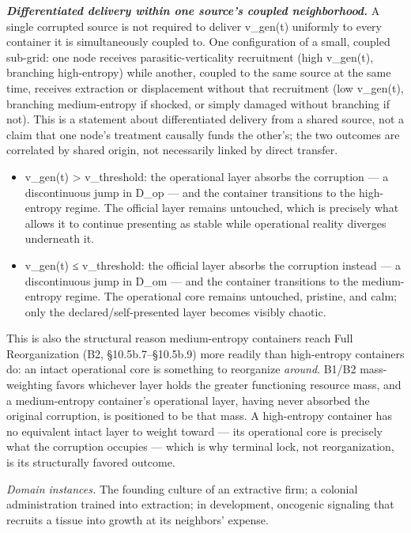 \documentclass[
]{article}
\begin{document}
\emph{\textbf{Differentiated delivery within one source's coupled
neighborhood.}} A single corrupted source is not required to deliver
v\_gen(t) uniformly to every container it is simultaneously coupled to.
One configuration of a small, coupled sub-grid: one node receives
parasitic-verticality recruitment (high v\_gen(t), branching
high-entropy) while another, coupled to the same source at the same
time, receives extraction or displacement without that recruitment (low
v\_gen(t), branching medium-entropy if shocked, or simply damaged
without branching if not). This is a statement about differentiated
delivery from a shared source, not a claim that one node's treatment
causally funds the other's; the two outcomes are correlated by shared
origin, not necessarily linked by direct transfer.

\begin{itemize}
\item
  v\_gen(t) \textgreater{} v\_threshold: the operational layer absorbs
  the corruption --- a discontinuous jump in D\_op --- and the container
  transitions to the high-entropy regime. The official layer remains
  untouched, which is precisely what allows it to continue presenting as
  stable while operational reality diverges underneath it.
\item
  v\_gen(t) ≤ v\_threshold: the official layer absorbs the corruption
  instead --- a discontinuous jump in D\_om --- and the container
  transitions to the medium-entropy regime. The operational core remains
  untouched, pristine, and calm; only the declared/self-presented layer
  becomes visibly chaotic.
\end{itemize}

This is also the structural reason medium-entropy containers reach Full
Reorganization (B2, §10.5b.7--§10.5b.9) more readily than high-entropy
containers do: an intact operational core is something to reorganize
\emph{around}. B1/B2 mass-weighting favors whichever layer holds the
greater functioning resource mass, and a medium-entropy container's
operational layer, having never absorbed the original corruption, is
positioned to be that mass. A high-entropy container has no equivalent
intact layer to weight toward --- its operational core is precisely what
the corruption occupies --- which is why terminal lock, not
reorganization, is its structurally favored outcome.

\emph{Domain instances.} The founding culture of an extractive firm; a
colonial administration trained into extraction; in development,
oncogenic signaling that recruits a tissue into growth at its neighbors'
expense.
\end{document}

